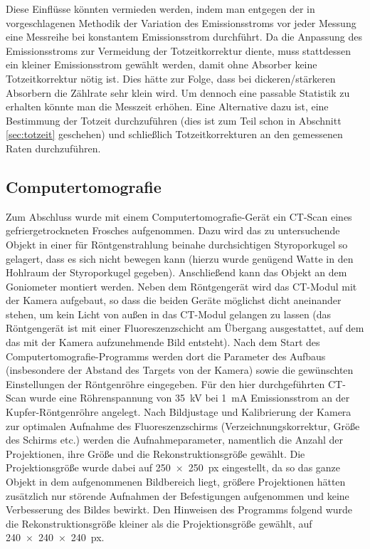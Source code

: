\documentclass[11pt, a4paper]{article}
\numberwithin{equation}{section}
\begin{document}
Diese Einflüsse könnten vermieden werden, indem man entgegen der in \cite{anleitung} vorgeschlagenen Methodik der Variation des Emissionsstroms vor jeder Messung eine Messreihe bei konstantem Emissionsstrom durchführt.
Da die Anpassung des Emissionsstroms zur Vermeidung der Totzeitkorrektur diente, muss stattdessen ein kleiner Emissionsstrom gewählt werden, damit ohne Absorber keine Totzeitkorrektur nötig ist.
Dies hätte zur Folge, dass bei dickeren/stärkeren Absorbern die Zählrate sehr klein wird.
Um dennoch eine passable Statistik zu erhalten könnte man die Messzeit erhöhen.
Eine Alternative dazu ist, eine Bestimmung der Totzeit durchzuführen (dies ist zum Teil schon in Abschnitt \ref{sec:totzeit} geschehen) und schließlich Totzeitkorrekturen an den gemessenen Raten durchzuführen.

\subsection{Computertomografie}

Zum Abschluss wurde mit einem Computertomografie-Gerät ein CT-Scan eines gefriergetrockneten Frosches aufgenommen.
Dazu wird das zu untersuchende Objekt in einer für Röntgenstrahlung beinahe durchsichtigen Styroporkugel so gelagert, dass es sich nicht bewegen kann (hierzu wurde genügend Watte in den Hohlraum der Styroporkugel gegeben).
Anschließend kann das Objekt an dem Goniometer montiert werden.
Neben dem Röntgengerät wird das CT-Modul mit der Kamera aufgebaut, so dass die beiden Geräte möglichst dicht aneinander stehen, um kein Licht von außen in das CT-Modul gelangen zu lassen (das Röntgengerät ist mit einer Fluoreszenzschicht am Übergang ausgestattet, auf dem das mit der Kamera aufzunehmende Bild entsteht).
Nach dem Start des Computertomografie-Programms werden dort die Parameter des Aufbaus (insbesondere der Abstand des Targets von der Kamera) sowie die gewünschten Einstellungen der Röntgenröhre eingegeben.
Für den hier durchgeführten CT-Scan wurde eine Röhrenspannung von \SI{35}{\kilo\volt} bei \SI{1}{\milli\ampere} Emissionsstrom an der Kupfer-Röntgenröhre angelegt.
Nach Bildjustage und Kalibrierung der Kamera zur optimalen Aufnahme des Fluoreszenzschirms (Verzeichnungskorrektur, Größe des Schirms etc.) werden die Aufnahmeparameter, namentlich die Anzahl der Projektionen, ihre Größe und die Rekonstruktionsgröße gewählt.
Die Projektionsgröße wurde dabei auf \SI{250x250}{px} eingestellt, da so das ganze Objekt in dem aufgenommenen Bildbereich liegt, größere Projektionen hätten zusätzlich nur störende Aufnahmen der Befestigungen aufgenommen und keine Verbesserung des Bildes bewirkt.
Den Hinweisen des Programms folgend wurde die Rekonstruktionsgröße kleiner als die Projektionsgröße gewählt, auf \SI{240x240x240}{px}.
\end{document}
